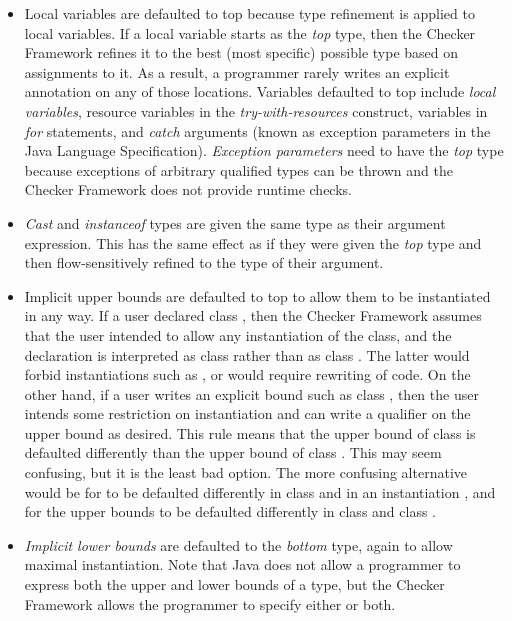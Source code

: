 \begin{itemize}
	\item Local variables are defaulted to top because type refinement is applied to local variables. If a local variable starts as the 
	\textit{top} type, then the Checker Framework refines it to the best (most specific) possible type based on assignments to it. As a 
	result, a programmer rarely writes an explicit annotation on any of those locations.
	Variables defaulted to top include \textit{local variables}, resource variables in the \textit{try-with-resources} construct, variables 
	in \textit{for} statements, and \textit{catch} arguments (known as exception parameters in the Java Language Specification). 
	\textit{Exception parameters} need to have the \textit{top} type because exceptions of arbitrary qualified types can be thrown 
	and the Checker Framework does not provide runtime checks.
	\item \textit{Cast} and \textit{instanceof} types are given the same type as their argument expression. This has the same effect as 
	if they were given the \textit{top} type and then flow-sensitively refined to the type of their argument.
	\item Implicit upper bounds are defaulted to top to allow them to be instantiated in any way. If a user declared class , then the Checker Framework assumes that the user intended to allow any instantiation of the class, and the declaration
	is interpreted as class  rather than as class . The latter would forbid instantiations such as , or would require rewriting of code. On the other hand, if a user writes 
	an explicit bound such as class , then the user intends some restriction on instantiation and can write a 
	qualifier on the upper bound as desired.
	This rule means that the upper bound of class  is defaulted differently than the upper bound of class . 
	This may seem confusing, but it is the least bad option. The more confusing alternative would be for  to be defaulted 
	differently in class  and in an instantiation , and for the upper bounds to be defaulted differently 
	in class  and class .
	\item \textit{Implicit lower bounds} are defaulted to the \textit{bottom} type, again to allow maximal instantiation. Note that Java does not allow a programmer to express both the upper and lower bounds of a type, but the Checker Framework allows the programmer to specify either or both.
\end{itemize}
